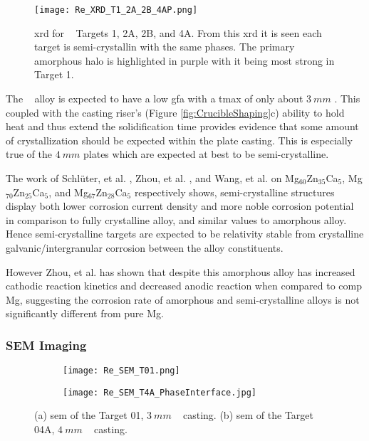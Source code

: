 \documentclass[a4paper,12pt,oneside]{report}%
\begin{document}
\begin{figure}[htbp]
	\centering
	\texttt{[image: Re\_XRD\_T1\_2A\_2B\_4AP.png]}
	\caption{\acrshort{xrd} for \MgZnCa~ Targets 1, 2A, 2B, and 4A. From this \acrshort{xrd} it is seen each target is semi-crystallin with the same phases. The primary amorphous halo is highlighted in purple with it being most strong in Target 1.}
	\label{fig:XRD_T1_2_4}
\end{figure}

The \MgZnCa~ alloy is expected to have a low \gls{gfa} with a \gls{tmax} of only about $3~ mm$ \cite{Gu2005}. This coupled with the casting riser's (Figure \ref{fig:CrucibleShaping}c) ability to hold heat and thus extend the solidification time provides evidence that some amount of crystallization should be expected within the plate casting. This is especially true of the $4~ mm$ plates which are expected at best to be semi-crystalline.  

The work of Schlüter, et al. \cite{Schluter2012}, Zhou, et al. \cite{Zhou2013}, and Wang, et al. \cite{Wang2012} on Mg$_{60}$Zn$_{35}$Ca$_{5}$, Mg$_{70}$Zn$_{25}$Ca$_{5}$, and Mg$_{67}$Zn$_{28}$Ca$_{5}$ respectively shows, semi-crystalline structures display both lower corrosion current density and more noble corrosion potential in comparison to fully crystalline alloy, and similar values to amorphous alloy. Hence semi-crystalline targets are expected to be relativity stable from crystalline galvanic/intergranular corrosion between the alloy constituents. 

However Zhou, et al. \cite{Zhou2013} has shown that despite this amorphous alloy has increased cathodic reaction kinetics and decreased anodic reaction when compared to \acrshort{comp} Mg, suggesting the corrosion rate of amorphous and semi-crystalline alloys is not significantly different from pure Mg.

\subsubsection{SEM Imaging}

\begin{figure}[htbp]
	\centering
	\begin{subfigure}[htbp]{0.51\textwidth}
		\texttt{[image: Re\_SEM\_T01.png]}
		\caption{}
		\label{fig:SEMT01}
	\end{subfigure}
	\begin{subfigure}[htbp]{0.47\textwidth}
		\texttt{[image: Re\_SEM\_T4A\_PhaseInterface.jpg]}
		\caption{}
		\label{fig:SEMT04A}
	\end{subfigure}
	\caption{(a) \acrshort{sem} of the Target 01, $3~ mm$ \MgZnCa~ casting. (b) \acrshort{sem} of the Target 04A, $4~ mm$ \MgZnCa~ casting.}%
	\label{fig:SEMT0104A}
\end{figure}
\end{document}
